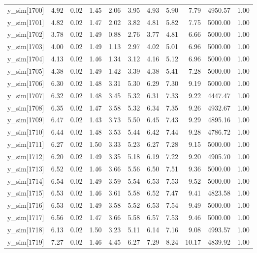 \begin{table}[ht]
\begin{tabular}{rrrrrrrrrrr}
  y\_sim[1700] & 4.92 & 0.02 & 1.45 & 2.06 & 3.95 & 4.93 & 5.90 & 7.79 & 4950.57 & 1.00 \\ 
  y\_sim[1701] & 4.82 & 0.02 & 1.47 & 2.02 & 3.82 & 4.81 & 5.82 & 7.75 & 5000.00 & 1.00 \\ 
  y\_sim[1702] & 3.78 & 0.02 & 1.49 & 0.88 & 2.76 & 3.77 & 4.81 & 6.66 & 5000.00 & 1.00 \\ 
  y\_sim[1703] & 4.00 & 0.02 & 1.49 & 1.13 & 2.97 & 4.02 & 5.01 & 6.96 & 5000.00 & 1.00 \\ 
  y\_sim[1704] & 4.13 & 0.02 & 1.46 & 1.34 & 3.12 & 4.16 & 5.12 & 6.96 & 5000.00 & 1.00 \\ 
  y\_sim[1705] & 4.38 & 0.02 & 1.49 & 1.42 & 3.39 & 4.38 & 5.41 & 7.28 & 5000.00 & 1.00 \\ 
  y\_sim[1706] & 6.30 & 0.02 & 1.48 & 3.31 & 5.30 & 6.29 & 7.30 & 9.19 & 5000.00 & 1.00 \\ 
  y\_sim[1707] & 6.32 & 0.02 & 1.48 & 3.45 & 5.32 & 6.31 & 7.33 & 9.22 & 4447.47 & 1.00 \\ 
  y\_sim[1708] & 6.35 & 0.02 & 1.47 & 3.58 & 5.32 & 6.34 & 7.35 & 9.26 & 4932.67 & 1.00 \\ 
  y\_sim[1709] & 6.47 & 0.02 & 1.43 & 3.73 & 5.50 & 6.45 & 7.43 & 9.29 & 4895.16 & 1.00 \\ 
  y\_sim[1710] & 6.44 & 0.02 & 1.48 & 3.53 & 5.44 & 6.42 & 7.44 & 9.28 & 4786.72 & 1.00 \\ 
  y\_sim[1711] & 6.27 & 0.02 & 1.50 & 3.33 & 5.23 & 6.27 & 7.28 & 9.15 & 5000.00 & 1.00 \\ 
  y\_sim[1712] & 6.20 & 0.02 & 1.49 & 3.35 & 5.18 & 6.19 & 7.22 & 9.20 & 4905.70 & 1.00 \\ 
  y\_sim[1713] & 6.52 & 0.02 & 1.46 & 3.66 & 5.56 & 6.50 & 7.51 & 9.36 & 5000.00 & 1.00 \\ 
  y\_sim[1714] & 6.54 & 0.02 & 1.49 & 3.59 & 5.54 & 6.53 & 7.53 & 9.52 & 5000.00 & 1.00 \\ 
  y\_sim[1715] & 6.53 & 0.02 & 1.46 & 3.61 & 5.58 & 6.52 & 7.47 & 9.41 & 4823.58 & 1.00 \\ 
  y\_sim[1716] & 6.53 & 0.02 & 1.49 & 3.58 & 5.52 & 6.53 & 7.54 & 9.49 & 5000.00 & 1.00 \\ 
  y\_sim[1717] & 6.56 & 0.02 & 1.47 & 3.66 & 5.58 & 6.57 & 7.53 & 9.46 & 5000.00 & 1.00 \\ 
  y\_sim[1718] & 6.13 & 0.02 & 1.50 & 3.23 & 5.11 & 6.14 & 7.16 & 9.08 & 4993.57 & 1.00 \\ 
  y\_sim[1719] & 7.27 & 0.02 & 1.46 & 4.45 & 6.27 & 7.29 & 8.24 & 10.17 & 4839.92 & 1.00 \\ 

\end{tabular}
\end{table}
